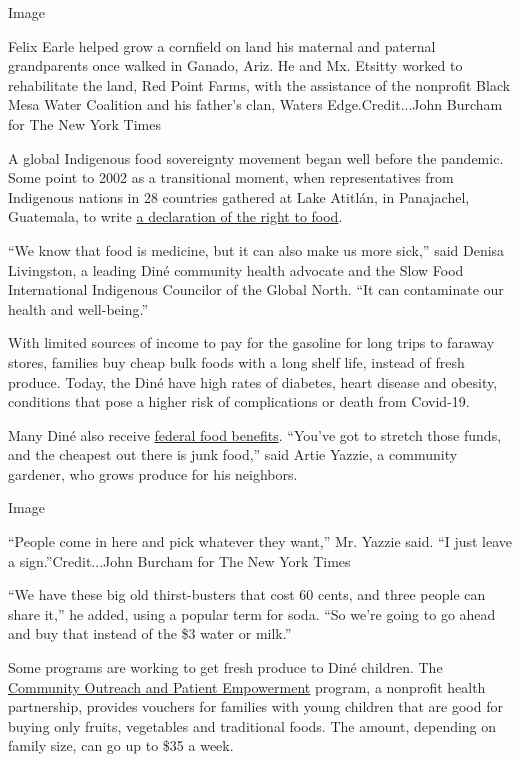 Image

Felix Earle helped grow a cornfield on land his maternal and paternal
grandparents once walked in Ganado, Ariz. He and Mx. Etsitty worked to
rehabilitate the land, Red Point Farms, with the assistance of the
nonprofit Black Mesa Water Coalition and his father's clan, Waters
Edge.Credit...John Burcham for The New York Times

A global Indigenous food sovereignty movement began well before the
pandemic. Some point to 2002 as a transitional moment, when
representatives from Indigenous nations in 28 countries gathered at Lake
Atitlán, in Panajachel, Guatemala, to write
\href{https://www.iitc.org/wp-content/uploads/2013/07/FINAL_Atitlan-Declaration-Food-Security_Apr25_ENGL.pdf}{a
declaration of the right to food}.

``We know that food is medicine, but it can also make us more sick,''
said Denisa Livingston, a leading Diné community health advocate and the
Slow Food International Indigenous Councilor of the Global North. ``It
can contaminate our health and well-being.''

With limited sources of income to pay for the gasoline for long trips to
faraway stores, families buy cheap bulk foods with a long shelf life,
instead of fresh produce. Today, the Diné have high rates of diabetes,
heart disease and obesity, conditions that pose a higher risk of
complications or death from Covid-19.

Many Diné also receive
\href{https://gardenwarriorsgoodseeds.com/2020/05/03/native-food-systems-in-the-time-of-covid-19/}{federal
food benefits}. ``You've got to stretch those funds, and the cheapest
out there is junk food,'' said Artie Yazzie, a community gardener, who
grows produce for his neighbors.

Image

``People come in here and pick whatever they want,'' Mr. Yazzie said.
``I just leave a sign.''Credit...John Burcham for The New York Times

``We have these big old thirst-busters that cost 60 cents, and three
people can share it,'' he added, using a popular term for soda. ``So
we're going to go ahead and buy that instead of the \$3 water or milk.''

Some programs are working to get fresh produce to Diné children. The
\href{https://www.copeprogram.org/}{Community Outreach and Patient
Empowerment} program, a nonprofit health partnership, provides vouchers
for families with young children that are good for buying only fruits,
vegetables and traditional foods. The amount, depending on family size,
can go up to \$35 a week.

